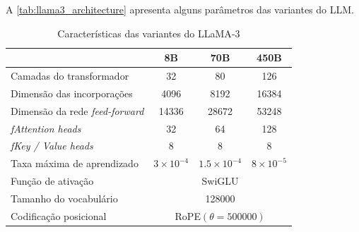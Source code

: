 A \autoref{tab:llama3_architecture} apresenta alguns parâmetros das variantes do \ac{LLM}.

\begin{table}[ht]
    \caption{\small Características das variantes do \ac{LLaMA}-3}
    \centering
    \begin{tabular}{l|ccc}
        \hline
                                               & 8B                                                                   & 70B                                      & 450B                                   \\ \hline
        Camadas do transformador               & 32                                                                   & 80                                       & 126                                    \\
        Dimensão das incorporações             & 4096                                                                 & 8192                                     & 16384                                  \\
        Dimensão da rede \textit{feed-forward} & 14336                                                                & 28672                                    & 53248                                  \\
        \textit{fAttention heads}              & 32                                                                   & 64                                       & 128                                    \\
        \textit{fKey / Value heads}            & 8                                                                    & 8                                        & 8                                      \\
        Taxa máxima de aprendizado             & \begin{math}3 \times 10^{-4}\end{math}                               & \begin{math}1.5 \times 10^{-4}\end{math} & \begin{math}8 \times 10^{-5}\end{math} \\
        Função de ativação                     & \multicolumn{3}{c}{\ac{SwiGLU}}                                                                                                                          \\
        Tamanho do vocabulário                 & \multicolumn{3}{c}{128000}                                                                                                                               \\
        Codificação posicional                 & \multicolumn{3}{c}{\ac{RoPE}\begin{math}(\theta = 500000)\end{math}}                                                                                     \\ \hline
    \end{tabular}
    \label{tab:llama3_architecture}
\end{table}

